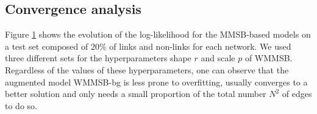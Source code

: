 
\begin{table}
\centering
	
\label{table:roc}
\end{table}

%
%
\subsection {Convergence analysis} %
Figure \ref{fig:conv_entropy} shows the evolution of the log-likelihood for the MMSB-based models on a test set composed of 20\% of links and non-links for each network. We used three different sets for the hyperparameters shape $r$ and scale $p$ of WMMSB. Regardless of the values of these hyperparameters, one can observe that the augmented model WMMSB-bg is less prone to overfitting, usually converges to a better solution and only needs a small proportion of the total number $N^2$ of edges to do so.

\begin{figure}[h]
\centering
	
    \label{fig:conv_entropy}
\end{figure}

